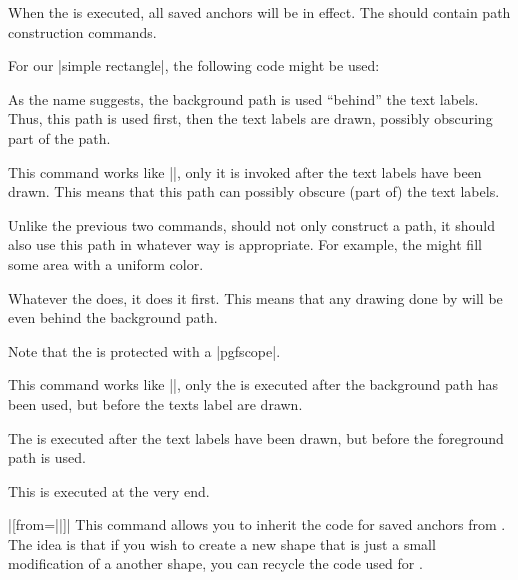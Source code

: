\begin{command}{\pgfdeclareshape{}}
\begin{command}{\backgroundpath{}}
    When the  is executed, all saved anchors will be in
    effect. The  should contain path construction
    commands.

    For our |simple rectangle|, the following code might be used:
\begin{codeexample}
\end{codeexample}
    As the name suggests, the background path is used ``behind'' the
    text labels. Thus, this path is used first, then the text labels are
    drawn, possibly obscuring part of the path.
  \end{command}
  \begin{command}{\foregroundpath{}}
    This command works like |\backgroundpath|, only it is invoked
    after the text labels have been drawn. This means that this path can
    possibly obscure (part of) the text labels.
  \end{command}
  \begin{command}{\behindbackgroundpath{}}
    Unlike the previous two commands,  should not only
    construct a path, it should also use this path in whatever way is
    appropriate. For example, the  might fill some area
    with a uniform color.

    Whatever the  does, it does it first. This means that
    any drawing done by  will be even behind the background
    path.

    Note that the  is protected with a |{pgfscope}|.
  \end{command}
  \begin{command}{\beforebackgroundpath{}}
    This command works like |\behindbackgroundpath|, only the
     is executed after the background path has been used,
    but before the texts label are drawn.
  \end{command}
  \begin{command}{\behindforegroundpath{}}
    The  is executed after the text labels have been drawn,
    but before the foreground path is used.
  \end{command}
  \begin{command}{\beforeforegroundpath{}}
    This  is executed at the very end.
  \end{command}
  \begin{command}{\inheritsavedanchors|[from=||]|}
    This command allows you to inherit the code for saved anchors from
    . The idea is that if you wish to create
    a new shape that is just a small modification of a another shape,
    you can recycle the code used for .


\end{command}
\end{command}
